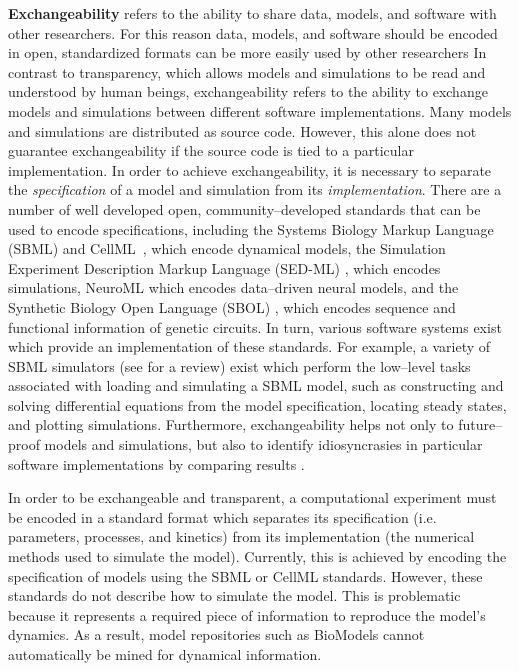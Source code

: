 \documentclass[10pt,letterpaper]{article}
\begin{document}
\textbf{Exchangeability} refers to the ability to share data, models, and software with other researchers. For this reason data, models, and software should be encoded in open, standardized formats can be more easily used by other researchers  In contrast to transparency, which allows models and simulations to be read and understood by human beings, exchangeability refers to the ability to exchange models and simulations between different software implementations. Many models and simulations are distributed as source code. However, this alone does not guarantee exchangeability if the source code is tied to a particular implementation. In order to achieve exchangeability, it is necessary to separate the \textit{specification} of a model and simulation from its \textit{implementation}. There are a number of well developed open, community--developed standards that can be used to encode specifications, including the Systems Biology Markup Language (SBML) \cite{hucka2003systems,bornstein2008libsbml} and CellML~\cite{cuellar2003overview}, which encode dynamical models, the Simulation Experiment Description Markup Language (SED-ML) \cite{waltemath2011reproducible}, which encodes simulations, NeuroML \cite{gleeson2010neuroml} which encodes data--driven neural models, and the Synthetic Biology Open Language (SBOL) \cite{bartley2015synthetic,galdzicki2014synthetic}, which encodes sequence and functional information of genetic circuits. In turn, various software systems exist which provide an implementation of these standards. For example, a variety of SBML simulators (see \cite{sauro2008standards} %
for a review) exist which perform the low--level tasks associated with loading and simulating a SBML model, such as constructing and solving differential equations from the model specification, locating steady states, and plotting simulations. Furthermore, exchangeability helps not only to future--proof models and simulations, but also to identify idiosyncrasies in particular software implementations by comparing results \cite{bergmann2008comparing}.

In order to be exchangeable and transparent, a computational experiment must be encoded in a standard format which separates its specification (i.e. parameters, processes, and kinetics) from its implementation (the numerical methods used to simulate the model). Currently, this is achieved by encoding the specification of models using the SBML or CellML standards. However, these standards do not describe how to simulate the model. This is problematic because it represents a required piece of information to reproduce the model's dynamics. As a result, model repositories such as BioModels \cite{le2006biomodels} cannot automatically be mined for dynamical information.
\end{document}
